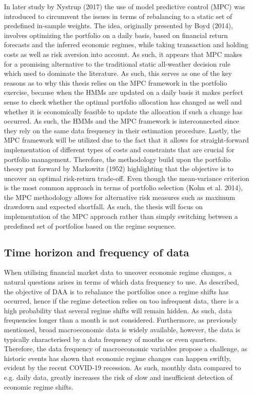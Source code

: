 In later study by Nystrup (2017) the use of model predictive control (MPC) was introduced to circumvent the issues in terms of rebalancing to a static set of predefined in-sample weights. The idea, originally presented by Boyd (2014), involves optimizing the portfolio on a daily basis, based on financial return forecasts and the inferred economic regimes, while taking transaction and holding costs as well as risk aversion into account. As such, it appears that MPC makes for a promising alternative to the traditional static all-weather decision rule which used to dominate the literature. As such, this serves as one of the key reasons as to why this thesis relies on the MPC framework in the portfolio exercise, because when the HMMs are updated on a daily basis it makes perfect sense to check whether the optimal portfolio allocation has changed as well and whether it is economically feasible to update the allocation if such a change has occurred. As such, the HMMs and the MPC framework is interconnected since they rely on the same data frequency in their estimation procedure. Lastly, the MPC framework will be utilized due to the fact that it allows for straight-forward implementation of different types of costs and constraints that are crucial for portfolio management. Therefore, the methodology build upon the portfolio theory put forward by Markowitz (1952) highlighting that the objective is to uncover an optimal risk-return trade-off. Even though the mean-variance criterion is the most common approach in terms of portfolio selection (Kolm et al. 2014), the MPC methodology allows for alternative risk measures such as maximum drawdown and expected shortfall. As such, the thesis will focus on implementation of the MPC approach rather than simply switching between a predefined set of portfolios based on the regime sequence.  


\subsection*{Time horizon and frequency of data}
\label{subsection: Data frequency}

When utilising financial market data to uncover economic regime changes, a natural questions arises in terms of which data frequency to use. As described, the objective of DAA is to rebalance the portfolios once a regime shifts has occurred, hence if the regime detection relies on too infrequent data, there is a high probability that several regime shifts will remain hidden. As such, data frequencies longer than a month is not considered. Furthermore, as previously mentioned, broad macroeconomic data is widely available, however, the data is typically characterised by a data frequency of months or even quarters. Therefore, the data frequency of macroeconomic variables propose a challenge, as historic events has shown that economic regime changes can happen swiftly, evident by the recent COVID-19 recession. As such, monthly data compared to e.g. daily data, greatly increases the risk of slow and insufficient detection of economic regime shifts.
 
